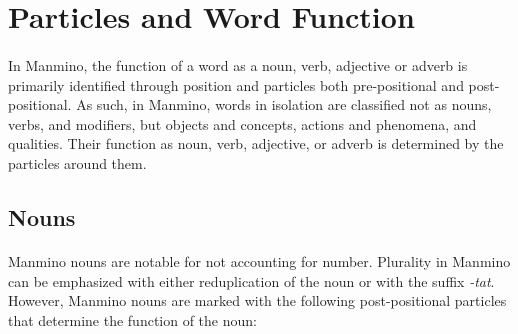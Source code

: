 \documentclass{book}
\begin{document}
    \section{Particles and Word Function}
            \paragraph{}
        In Manmino, the function of a word as a noun, verb, adjective or adverb is primarily identified through position and particles both pre-positional and post-positional. As such, in Manmino, words in isolation are classified not as nouns, verbs, and modifiers, but objects and concepts, actions and phenomena, and qualities. Their function as noun, verb, adjective, or adverb is determined by the particles around them. 
        \subsection{Nouns}
            \paragraph{}
            Manmino nouns are notable for not accounting for number. Plurality in Manmino can be emphasized with either reduplication of the noun or with the suffix \textit{-tat}. However, Manmino nouns are marked with the following post-positional particles that determine the function of the noun:
                                                                                                                                                                                       
            
\end{document}
